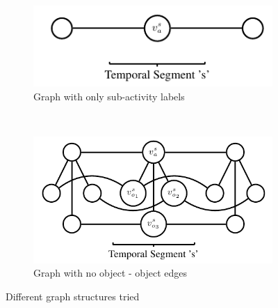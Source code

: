 \documentclass{article} %
\begin{document}
\begin{figure}
        \centering
        \begin{subfigure}[b]{0.45\textwidth}
                \includegraphics[width=\textwidth]{model_simple}
                \caption{Graph with only sub-activity labels}
                \label{fig:model_simple}
        \end{subfigure}%
        ~ %
        \begin{subfigure}[b]{0.45\textwidth}
                \includegraphics[width=\textwidth]{model_no_oo}
                \caption{Graph with no object - object edges}
                \label{fig:model_no_oo}
        \end{subfigure}
       
        \caption{Different graph structures tried}
        \label{fig:graph_structures}
\end{figure}
\end{document}
